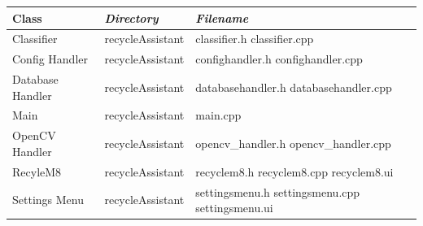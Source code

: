 \documentclass[conference]{IEEEtran}
\begin{document}
\begin{table}[htbp!]\normalsize
\begin{center}
\begin{tabular}{|p{1.5cm}|p{2.2cm}|p{3.9cm}|}
\hline
\textbf{Class} & \textbf{\textit{Directory}}& \textbf{\textit{Filename}}\\
\hline
Classifier & recycleAssistant & classifier.h
\newline
classifier.cpp
\\ \hline
Config Handler & recycleAssistant & confighandler.h
\newline
confighandler.cpp
\newline
\\ \hline
Database Handler & recycleAssistant & databasehandler.h
\newline
databasehandler.cpp
\newline
\\ \hline
Main & recycleAssistant & main.cpp
\newline
\\ \hline
OpenCV Handler & recycleAssistant & opencv\_handler.h
\newline
opencv\_handler.cpp
\newline
\\ \hline
RecyleM8 & recycleAssistant & recyclem8.h
\newline
recyclem8.cpp
\newline
recyclem8.ui
\newline
\\ \hline
Settings Menu & recycleAssistant & settingsmenu.h
\newline
settingsmenu.cpp
\newline
settingsmenu.ui
\newline
\\ \hline
\end{tabular}
\label{tab1}
\end{center}
\end{table}
\end{document}
